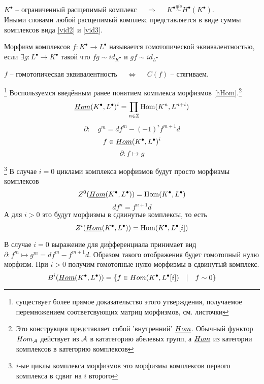 \documentclass[../main.tex]{subfiles}
\begin{document}
\begin{to_suj}\label{split1}
$K^\bullet$ -- ограниченный расщепимый комплекс $\quad \Rightarrow \quad$ $K^\bullet\overset{qis}{\sim}H^\bullet(K^\bullet)$. \\
Иными словами любой расщепимый комплекс представляется в виде суммы комплексов вида \ref{vid2} и \ref{vid3}.
\end{to_suj}
\begin{to_def}
    Морфизм комплексов $f\colon K^\bullet \to L^\bullet$ называется гомотопической эквивалентностью, если $\exists g\colon L^\bullet \to K^\bullet$ такой что $fg \sim id_{K^\bullet}$ и $gf\sim id_{L^\bullet}$
\end{to_def}
\begin{to_suj}
\label{hom_eq_con}
 $f$ -- гомотопическая эквивалентность $\quad \Leftrightarrow \quad$ $C(f)$ -- стягиваем.
\end{to_suj}\footnote{существует более прямое доказательство этого утверждения, получаемое перемножением соответсвующих матриц морфизмов, см. листочки}
    Воспользуемся введённым ранее понятием комплекса морфизмов \ref{hHom}.\footnote{Это конструкция представляет собой 'внутренний' $\underline{Hom}$. Обычный функтор $Hom_{\mathcal{A}}$ действует из $\mathcal{A}$ в кататегорию абелевых групп, а $\underline{Hom}$ из категории комплексов в категорию комплексов} 
    \[\underline{Hom} (K^\bullet, L^\bullet)^{i} = \prod_{n\in \mathbb{Z}}\operatorname{Hom}(K^n, L^{n+i})\]
    \[\partial\colon \quad g^m = df^m - (-1)^if^{m+1}d\]
    \[f\in \underline{Hom}(K^\bullet, L^\bullet)^i\]
    \[\partial\colon f \mapsto g\]
\begin{to_com}\footnote{$i$-ые циклы комплекса морфизмов это морфизмы комплексов первого комплекса в сдвиг на $i$ второго}
    В случае $i=0$ циклами комплекса морфизмов будут просто морфизмы комплексов 
    \[
        Z^0 (\underline{Hom}(K^\bullet, L^\bullet)) = \operatorname{Hom}(K^\bullet, L^\bullet)
    \]
    \[
    df^n = f^{n+1}d
    \]
    А для $i>0$ это будут морфизмы в сдвинутые комплексы, то есть 
    \[
    Z^i (\underline{Hom}(K^\bullet, L^\bullet)) = \operatorname{Hom}(K^\bullet, L^\bullet[i])
    \]
\end{to_com}
\begin{to_com}
    В случае $i=0$ выражение для дифференциала принимает вид $\partial\colon f^m\mapsto g^m = df^m - f^{m+1}d$. Образом такого отображения будет гомотопный нулю морфизм. При $i>0$ получим гомотопные нулю морфизмы в сдвинутый комплекс.
    \[
        B^i (\underline{Hom}(K^\bullet, L^\bullet)) = \lbrace f\in Hom(K^\bullet, L^\bullet[i])\quad|\quad f\sim 0 \rbrace
    \]
\end{to_com}
\end{document}
